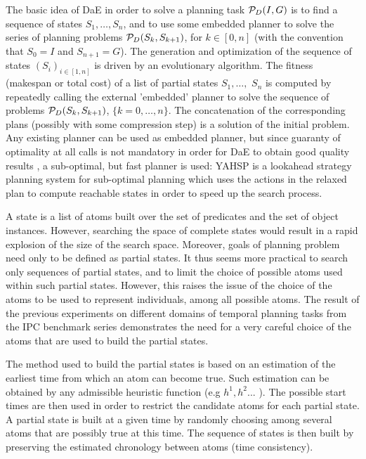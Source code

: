 \documentclass{MYsig-alternate}
\begin{document}
The basic idea of DaE in order to solve a planning task ${\cal P}_D(I,G)$ is to find a sequence of states $S_1, \ldots, S_n$, and to use some embedded planner to solve the series of planning problems ${\cal P}_D(S_{k},S_{k+1})$, for $k \in [0,n]$ (with the convention that $S_0 = I$ and $S_{n+1} = G$). The generation and optimization of the sequence of states $(S_i)_{i \in [1,n]}$ is driven by an evolutionary algorithm. 
The fitness (makespan or total cost) of a list of partial states $S_1, \ldots,$ $S_n$ is computed by repeatedly calling the external 'embedded' planner to solve the sequence of problems ${\cal P}_D(S_{k},S_{k+1})$, $\{k=0,\ldots,n\}$. The concatenation of the corresponding plans (possibly with some compression step) is a solution of the initial problem.
Any existing planner can be used as embedded planner, but since guaranty of optimality at all calls is not mandatory in order for DaE to obtain good quality results \cite{Bibai:ICAPS2010}, a sub-optimal, but fast planner is used: YAHSP \cite{V:icaps04} is a lookahead strategy planning system for sub-optimal planning which uses the  actions in the relaxed plan to compute reachable states in order to speed up the search process. 

A state is a list of atoms built over the set of predicates and the set of object instances. However, searching the space of complete states would result in a rapid explosion of the size of the search space. Moreover, goals of planning problem need only to be defined as partial states. It thus seems more practical to search only sequences of partial states, and to limit the choice of possible atoms used within such partial states. However, this raises the issue of the choice of the atoms to be used to represent individuals, among all possible atoms. The result of the previous experiments on different domains of temporal planning tasks from the IPC benchmark series \cite{BibEvoCop2009} demonstrates the need for a very careful choice of the atoms that are used to build the partial states. 

The method used to build the partial states is based on an estimation of the earliest time from which an atom can become true. Such estimation can be obtained by any admissible heuristic function (e.g $h^1,h^2...$ \cite{HaslumGeffner-AIPS-2000}). The possible start times are then used in order to restrict the candidate atoms for each partial state. A partial state is built at a given time by randomly choosing among several atoms that are possibly true at this time. The sequence of states is then built by preserving the estimated chronology between atoms (time consistency).
\end{document}
